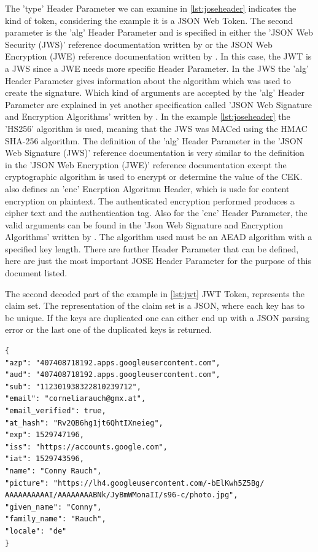 {The 'type' Header Parameter we can examine in \ref{lst:joseheader} indicates the kind of token, considering the example it is a JSON Web Token. The second parameter is the 'alg' Header Parameter and is specified in either the 'JSON Web Security (JWS)' reference documentation written by \cite{JWS:IETF:Jones:2015} or the JSON Web Encryption (JWE) reference documentation written by \cite{JWE:IETF:Jones:2015}. In this case, the JWT is a JWS since a JWE needs more specific Header Parameter. In the JWS the 'alg' Header Parameter gives information about the algorithm which was used to create the signature. Which kind of arguments are accepted by the 'alg' Header Parameter are explained in yet another specification called 'JSON Web Signature and Encryption Algorithms' written by \cite{JWA:Jones:2015}. In the example \ref{lst:joseheader} the 'HS256' algorithm is used, meaning that the JWS was MACed using the HMAC SHA-256 algorithm. The definition of the 'alg' Header Parameter in the 'JSON Web Signature (JWS)' reference documentation is very similar to the definition in the 'JSON Web Encryption (JWE)' reference documentation except the cryptographic algorithm is used to encrypt or determine the value of the CEK. \cite{JWE:IETF:Jones:2015} also defines an 'enc' Encrption Algoritmn Header, which is usde for content encryption on plaintext. The authenticated encryption performed produces a cipher text and the authentication tag. Also for the 'enc' Header Parameter, the valid arguments can be found in the 'Json Web Signature and Encryption Algorithms' written by \cite{JWA:Jones:2015}. The algorithm used must be an AEAD algorithm with a specified key length. There are further Header Parameter that can be defined, here are just the most important JOSE Header Parameter for the purpose of this document listed. 

The second decoded part of the example in \ref{lst:jwt} JWT Token, represents the claim set. The representation of the claim set is a JSON, where each key has to be unique. If the keys are duplicated one can either end up with a JSON parsing error or the last one of the duplicated keys is returned. 

\begin{lstlisting}
{
"azp": "407408718192.apps.googleusercontent.com",
"aud": "407408718192.apps.googleusercontent.com",
"sub": "112301938322810239712",
"email": "corneliarauch@gmx.at",
"email_verified": true,
"at_hash": "Rv2QB6hg1jt6QhtIXneieg",
"exp": 1529747196,
"iss": "https://accounts.google.com",
"iat": 1529743596,
"name": "Conny Rauch",
"picture": "https://lh4.googleusercontent.com/-bElKwh5Z5Bg/
AAAAAAAAAAI/AAAAAAAABNk/JyBmWMonaII/s96-c/photo.jpg",
"given_name": "Conny",
"family_name": "Rauch",
"locale": "de"
}
\end{lstlisting}

}
